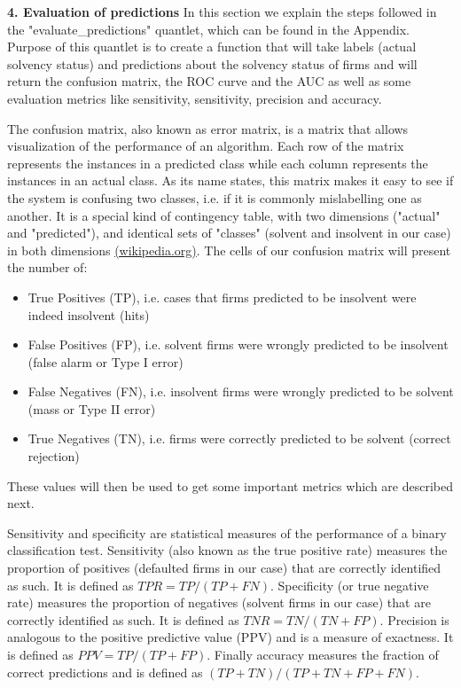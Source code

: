 \documentclass[11pt]{article}
\begin{document}
\vskip 0.5in
\textbf{4. Evaluation of predictions}
\vskip 0.2in
In this section we explain the steps followed in the "evaluate\_predictions" quantlet, which can be found in the Appendix. Purpose of this quantlet is to create a function that will take labels (actual solvency status) and predictions about the solvency status of firms and will return the confusion matrix, the ROC curve and the AUC as well as some evaluation metrics like sensitivity, sensitivity, precision and accuracy.

The confusion matrix, also known as error matrix, is a matrix that allows visualization of the performance of an algorithm. Each row of the matrix represents the instances in a predicted class while each column represents the instances in an actual class. As its name states, this matrix makes it easy to see if the system is confusing two classes, i.e. if it is commonly mislabelling one as another. It is a special kind of contingency table, with two dimensions ("actual" and "predicted"), and identical sets of "classes" (solvent and insolvent in our case) in both dimensions \href{<https://en.wikipedia.org/wiki/Confusion_matrix>}{(wikipedia.org)}. The cells of our confusion matrix will present the number of:
\begin{itemize}
\item True Positives (TP), i.e. cases that firms predicted to be insolvent were indeed insolvent (hits)
\item False Positives (FP), i.e. solvent firms were wrongly predicted to be insolvent (false alarm or Type I error)
\item False Negatives (FN), i.e. insolvent firms were wrongly predicted to be solvent (mass or Type II error)
\item True Negatives (TN), i.e. firms were correctly predicted to be solvent (correct rejection) 
\end{itemize}
These values will then be used to get some important metrics which are described next.

Sensitivity and specificity are statistical measures of the performance of a binary classification test. Sensitivity (also known as the true positive rate) measures the proportion of positives (defaulted firms in our case) that are correctly identified as such. It is defined as $TPR=TP/(TP+FN)$. Specificity (or true negative rate) measures the proportion of negatives (solvent firms in our case) that are correctly identified as such. It is defined as $TNR=TN/(TN+FP)$. Precision is analogous to the positive predictive value (PPV) and is a measure of exactness. It is defined as $PPV=TP/(TP+FP)$. Finally accuracy measures the fraction of correct predictions and is defined as $(TP+TN)/(TP+TN+FP+FN)$.
\end{document}
